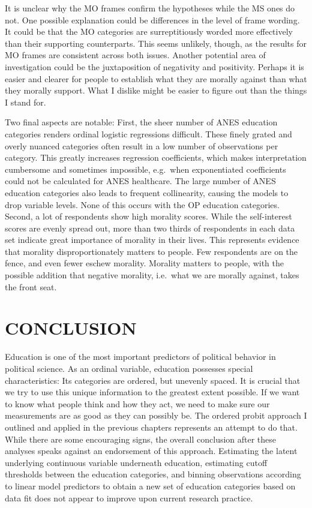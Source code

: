 \documentclass[12pt,econ]{sources/authesis}
\begin{document}
It is unclear why the MO frames confirm the hypotheses while the MS ones do not. One possible explanation could be differences in the level of frame wording. It could be that the MO categories are surreptitiously worded more effectively than their supporting counterparts. This seems unlikely, though, as the results for MO frames are consistent across both issues. Another potential area of investigation could be the juxtaposition of negativity and positivity. Perhaps it is easier and clearer for people to establish what they are morally against than what they morally support. What I dislike might be easier to figure out than the things I stand for.

Two final aspects are notable: First, the sheer number of ANES education categories renders ordinal logistic regressions difficult. These finely grated and overly nuanced categories often result in a low number of observations per category. This greatly increases regression coefficients, which makes interpretation cumbersome and sometimes impossible, e.g.~when exponentiated coefficients could not be calculated for ANES healthcare. The large number of ANES education categories also leads to frequent collinearity, causing the models to drop variable levels. None of this occurs with the OP education categories. Second, a lot of respondents show high morality scores. While the self-interest scores are evenly spread out, more than two thirds of respondents in each data set indicate great importance of morality in their lives. This represents evidence that morality disproportionately matters to people. Few respondents are on the fence, and even fewer eschew morality. Morality matters to people, with the possible addition that negative morality, i.e.~what we are morally against, takes the front seat.

\hypertarget{conclusion}{%
\chapter{CONCLUSION}\label{conclusion}}

Education is one of the most important predictors of political behavior in political science. As an ordinal variable, education possesses special characteristics: Its categories are ordered, but unevenly spaced. It is crucial that we try to use this unique information to the greatest extent possible. If we want to know what people think and how they act, we need to make sure our measurements are as good as they can possibly be. The ordered probit approach I outlined and applied in the previous chapters represents an attempt to do that. While there are some encouraging signs, the overall conclusion after these analyses speaks against an endorsement of this approach. Estimating the latent underlying continuous variable underneath education, estimating cutoff thresholds between the education categories, and binning observations according to linear model predictors to obtain a new set of education categories based on data fit does not appear to improve upon current research practice.
\end{document}
